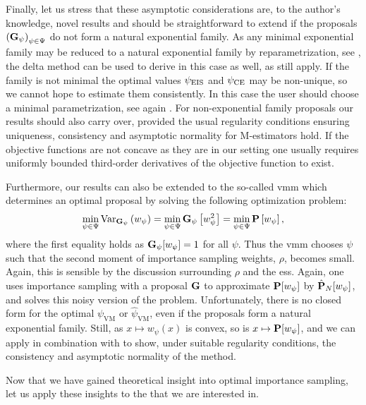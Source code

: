 Finally, let us stress that these asymptotic considerations are, to the author's knowledge, novel results and should be straightforward to extend if the proposals $\left(\G_{\psi}\right)_{\psi \in \Psi}$ do not form a natural exponential family. As any minimal exponential family may be reduced to a natural exponential family by reparametrization, see \citep[Theorem 1.9]{Brown1986Fundamentals}, the delta method can be used to derive  in this case as well, as  still apply. If the family is not minimal the optimal values $\peis$ and $\pce$ may be non-unique, so we cannot hope to estimate them consistently. In this case the user should choose a minimal parametrization, see again \citep[Theorem 1.9]{Brown1986Fundamentals}. 
For non-exponential family proposals our results should also carry over, provided the usual regularity conditions ensuring uniqueness, consistency and asymptotic normality for M-estimators hold. If the objective functions are not concave as they are in our setting one usually requires uniformly bounded third-order derivatives of the objective function to exist. 

Furthermore, our results can also be extended to the so-called \gls{vmm} which determines an optimal proposal by solving the following optimization problem:
$$
\min_{\psi\in\Psi} \var_{\G_{\psi}} \left( w_{\psi}  \right) = \min_{\psi \in \Psi} \G_{\psi} \left[w_{\psi}^2\right] = \min_{\psi\in\Psi} \P \left[w_{\psi} \right],
$$
where the first equality holds as $\G_{\psi}[w_{\psi}] = 1$ for all $\psi$. Thus the \acrshort{vmm} chooses $\psi$ such that the second moment of importance sampling weights, $\rho$, becomes small. Again, this is sensible by the discussion surrounding $\rho$ and the \acrshort{ess}. Again, one uses importance sampling with a proposal $\G$ to approximate $\P [w_{\psi}]$ by $\hat\P_{N} [w_{\psi}]$, and solves this noisy version of the problem.
Unfortunately, there is no closed form for the optimal $\psi_{\text{VM}}$ or $\hat\psi_{\text{VM}}$, even if the proposals form a natural exponential family. Still, as $x \mapsto w_{\psi}(x)$ is convex, so is $x \mapsto \P [w_{\psi}]$, and we can apply  in combination with  to show, under suitable regularity conditions, the consistency and asymptotic normality of the method. 

Now that we have gained theoretical insight into optimal importance sampling, let us apply these insights to the  that we are interested in.

